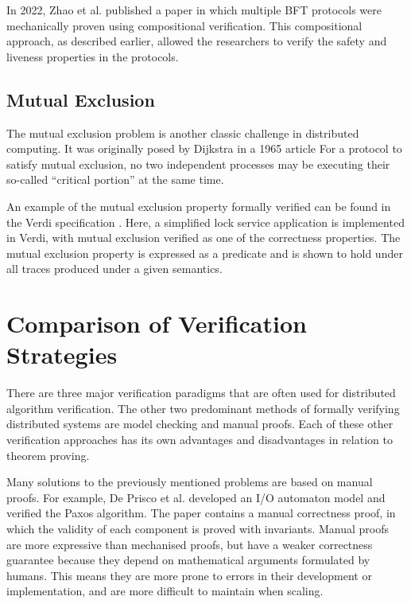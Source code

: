 \documentclass[acmsmall,screen,review]{acmart}
\begin{document}
    In 2022, Zhao et al. published a paper \cite{zhaoCompositionalVerificationComposite2024} in which multiple BFT protocols were mechanically proven using compositional verification.
    This compositional approach, as described earlier, allowed the researchers to verify the safety and liveness properties in the protocols. 

  \subsection{Mutual Exclusion }
    The mutual exclusion problem is another classic challenge in distributed computing.
    It was originally posed by Dijkstra in a 1965 article \cite{dijkstraSolutionProblem1965}
    For a protocol to satisfy mutual exclusion, no two independent processes may be executing their so-called ``critical portion'' at the same time.

    An example of the mutual exclusion property formally verified can be found in the Verdi specification \cite{wilcoxVerdiFrameworkImplementing2015}.
    Here, a simplified lock service application is implemented in Verdi, with mutual exclusion verified as one of the correctness properties.
    The mutual exclusion property is expressed as a predicate and is shown to hold under all traces produced under a given semantics.

\section{Comparison of Verification Strategies }

  There are three major verification paradigms that are often used for distributed algorithm verification.
  The other two predominant methods of formally verifying distributed systems are model checking and manual proofs.
  Each of these other verification approaches has its own advantages and disadvantages in relation to theorem proving.

  Many solutions to the previously mentioned problems are based on manual proofs.
  For example, De Prisco et al. \cite{depriscoRevisitingPaxosAlgorithm1997} developed an I/O automaton model and verified the Paxos algorithm.
  The paper contains a manual correctness proof, in which the validity of each component is proved with invariants.
  Manual proofs are more expressive than mechanised proofs,
  but have a weaker correctness guarantee because they depend on mathematical arguments formulated by humans.
  This means they are more prone to errors in their development or implementation, and are more difficult to maintain when scaling.
\end{document}
